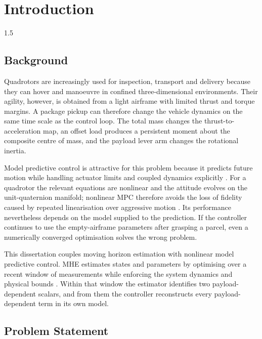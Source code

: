 
\chapter{Introduction}
\label{ch:introduction}
\begin{spacing}{1.5}
\setlength{\parskip}{0.22in}

\section{Background}

Quadrotors are increasingly used for inspection, transport and delivery because
they can hover and manoeuvre in confined three-dimensional environments. Their
agility, however, is obtained from a light airframe with limited thrust and
torque margins. A package pickup can therefore change the vehicle dynamics on the
same time scale as the control loop. The total mass changes the
thrust-to-acceleration map, an offset load produces a persistent moment about the
composite centre of mass, and the payload lever arm changes the rotational
inertia.

Model predictive control is attractive for this problem because it predicts
future motion while handling actuator limits and coupled dynamics explicitly
\cite{rawlings2017mpc,mayne2014mpc}. For a quadrotor the relevant equations are
nonlinear and the attitude evolves on the unit-quaternion manifold; nonlinear MPC
therefore avoids the loss of fidelity caused by repeated linearisation over
aggressive motion \cite{grune2017nmpc,kamel2017linear}. Its performance
nevertheless depends on the model supplied to the prediction. If the controller
continues to use the empty-airframe parameters after grasping a parcel, even a
numerically converged optimisation solves the wrong problem.

This dissertation couples moving horizon estimation with nonlinear model
predictive control. MHE estimates states and parameters by optimising over a
recent window of measurements while enforcing the system dynamics and physical
bounds \cite{rao2003mhe}. Within that window the estimator identifies two
payload-dependent scalars, and from them the controller reconstructs every
payload-dependent term in its own model.

\section{Problem Statement}


\end{spacing}
